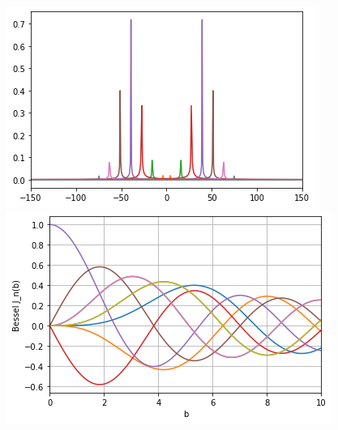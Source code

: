 \documentclass[11pt,aspectratio=169]{beamer}
\begin{document}
\begin{frame}
	\includegraphics[scale=0.5]{images/beta_1.png}
	\includegraphics[scale=0.5]{images/bessel.png}
\end{frame}	
\end{document}
